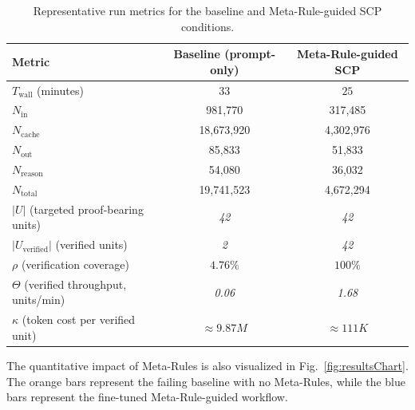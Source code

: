 \documentclass[conference]{IEEEtran}
\begin{document}
\begin{table}[!t]
\centering
\caption{Representative run metrics for the baseline and Meta-Rule-guided SCP conditions.}
\label{tab:results}
\small
\begin{tabular}{lcc}
\hline
Metric & Baseline (prompt-only) & Meta-Rule-guided SCP \\
\hline
$T_{\mathrm{wall}}$ (minutes) & 33 & $25$ \\
$N_{\mathrm{in}}$ & 981,770 & 317,485 \\
$N_{\mathrm{cache}}$ & 18,673,920 & 4,302,976 \\
$N_{\mathrm{out}}$ & 85,833 & 51,833 \\
$N_{\mathrm{reason}}$ & 54,080 & 36,032 \\
$N_{\mathrm{total}}$ & 19,741,523 & 4,672,294 \\
$|U|$ (targeted proof-bearing units) & \textit{42} & \textit{42} \\
$|U_{\mathrm{verified}}|$ (verified units) & \textit{2} & \textit{42} \\
$\rho$ (verification coverage) & \textit{$4.76\%$} & \textit{$100\%$} \\
$\Theta$ (verified throughput, units/min) & \textit{0.06} & \textit{1.68} \\
$\kappa$ (token cost per verified unit) & \textit{$\approx 9.87 M $} & \textit{$\approx 111K $} \\
\hline
\end{tabular}
\end{table}

The quantitative impact of Meta-Rules is also visualized in Fig.~\ref{fig:resultsChart}. The orange bars represent the failing baseline with no Meta-Rules, while the blue bars represent the fine-tuned Meta-Rule-guided workflow.

\end{document}
